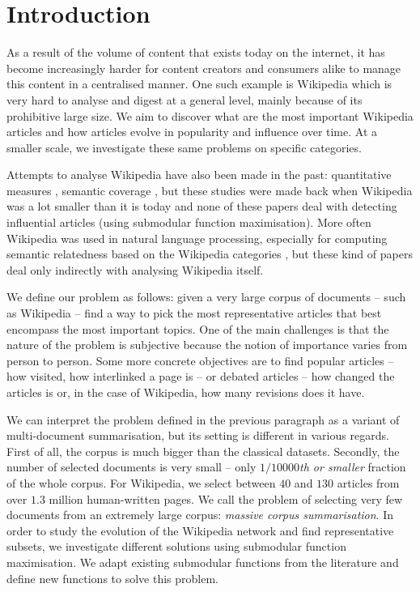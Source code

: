 \chapter{Introduction}

As a result of the volume of content that exists today on the internet, it has
become increasingly harder for content creators and consumers alike to manage
this content in a centralised manner. One such example is Wikipedia which is
very hard to analyse and digest at a general level, mainly because of its
prohibitive large size. We aim to discover what are the most important
Wikipedia articles and how articles evolve in popularity and influence over
time. At a smaller scale, we investigate these same problems on specific
categories.

Attempts to analyse Wikipedia have also been made in the past: quantitative
measures \cite{voss2005measuring}, semantic coverage
\cite{holloway2007analyzing}, but these studies were made back when Wikipedia
was a lot smaller than it is today and none of these papers deal with detecting
influential articles (using submodular function maximisation). More often
Wikipedia was used in natural language processing, especially for computing
semantic relatedness based on the Wikipedia categories
\cite{gabrilovich2007computing}, but these kind of papers deal only indirectly
with analysing Wikipedia itself.

We define our problem as follows: given a very large corpus of documents --
such as Wikipedia -- find a way to pick the most representative articles that
best encompass the most important topics. One of the main challenges is that
the nature of the problem is subjective because the notion of importance varies
from person to person. Some more concrete objectives are to find popular
articles -- how visited, how interlinked a page is -- or debated articles --
how changed the articles is or, in the case of Wikipedia, how many revisions
does it have.

We can interpret the problem defined in the previous paragraph as a variant of
multi-document summarisation, but its setting is different in various regards.
First of all, the corpus is much bigger than the classical datasets.
Secondly, the number of selected documents is very small -- only
\emph{\(1/10000\)th or smaller} fraction of the whole corpus. For Wikipedia, we
select between \(40\) and \(130\) articles from over {\(1.3\) million}
human-written pages. We call the problem of selecting very few documents from
an extremely large corpus: \emph{massive corpus summarisation}.  In order to
study the evolution of the Wikipedia network and find representative subsets,
we investigate different solutions using submodular function maximisation. We
adapt existing submodular functions from the literature and define new
functions to solve this problem.

